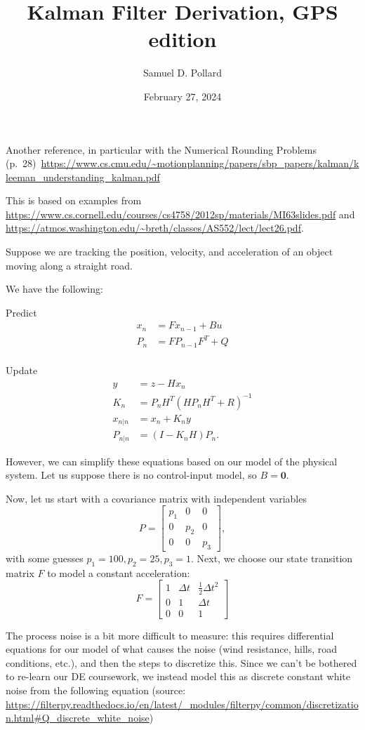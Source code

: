 \documentclass[11pt]{article}
\title{Kalman Filter Derivation, GPS edition}
\author{Samuel D. Pollard}
\date{February 27, 2024}
\begin{document}
\maketitle

Another reference, in particular with the Numerical Rounding Problems (p.~28)~\url{https://www.cs.cmu.edu/~motionplanning/papers/sbp_papers/kalman/kleeman_understanding_kalman.pdf}

This is based on examples from \url{https://www.cs.cornell.edu/courses/cs4758/2012sp/materials/MI63slides.pdf} and \url{https://atmos.washington.edu/~breth/classes/AS552/lect/lect26.pdf}.

Suppose we are tracking the position, velocity, and acceleration of an object moving along a straight road.

We have the following:

Predict
\begin{align*}
	x_n &= Fx_{n-1} + Bu \\
	P_n   &= F P_{n-1} F^T + Q \\
\end{align*}

Update
\begin{align*}
	y &= z - H x_{n} \\
	K_n &= P_{n} H^T (H P_n H^T + R)^{-1} \\
	x_{n|n} &= x_n + K_n y \\
	P_{n|n} &= (I - K_n H) P_n.
\end{align*}

However, we can simplify these equations based on our model of the physical system. Let us suppose there is no control-input model, so $B = \mathbf{0}$.

Now, let us start with a covariance matrix with independent variables
\[ P = 
	\begin{bmatrix}
	p_1 & 0   & 0  \\
	0   & p_2 & 0  \\
	0   & 0   & p_3
	\end{bmatrix},
\]
with some guesses $p_1 = 100, p_2 = 25, p_3 = 1$.
Next, we choose our state transition matrix $F$ to model a constant acceleration:
\[ F =
	\begin{bmatrix}
	1 & \Delta t & \frac12 \Delta t^2 \\
	0 & 1 & \Delta t \\
	0 & 0 & 1
	\end{bmatrix}
\]

The process noise is a bit more difficult to measure: this requires differential equations for our model of what causes the noise (wind resistance, hills, road conditions, etc.), and then the steps to discretize this. Since we can't be bothered to re-learn our DE coursework, we instead model this as discrete constant white noise from the following equation (source: \url{https://filterpy.readthedocs.io/en/latest/_modules/filterpy/common/discretization.html#Q_discrete_white_noise})
\end{document}
